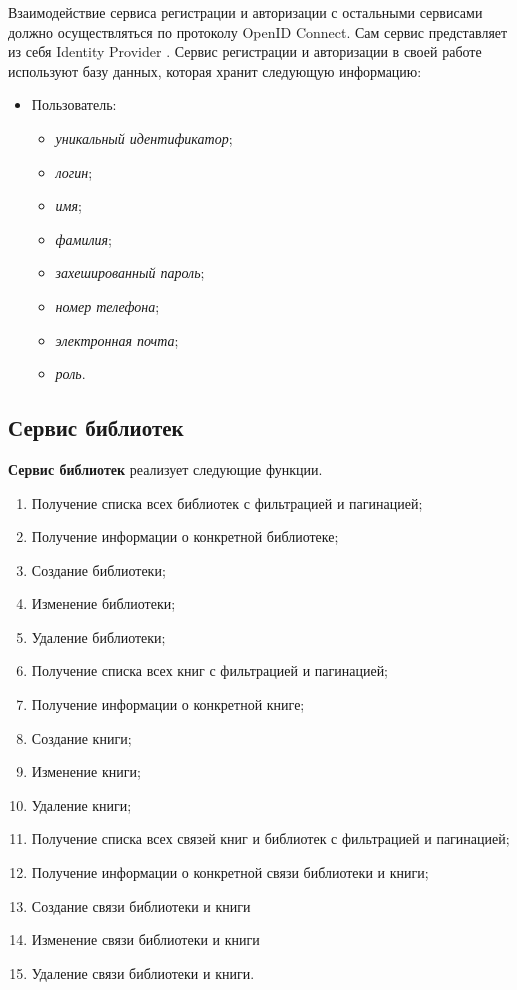 Взаимодействие сервиса регистрации и авторизации с остальными сервисами должно осуществляться по протоколу OpenID Connect. Сам сервис представляет из себя Identity Provider \cite{idprovider}. Сервис регистрации и авторизации в своей работе используют базу данных, которая хранит следующую информацию:
\begin{itemize}
    \item Пользователь:
    \begin{itemize}
        \item \textit{уникальный идентификатор};
        \item \textit{логин};
        \item \textit{имя};
        \item \textit{фамилия};
        \item \textit{захешированный пароль};
        \item \textit{номер телефона};
        \item \textit{электронная почта};
        \item \textit{роль}.
    \end{itemize}
\end{itemize}


\subsection{Сервис библиотек} \label{section:library}

\textbf{Сервис библиотек} реализует следующие функции.
\begin{enumerate}
	\item Получение списка всех библиотек с фильтрацией и пагинацией;
	\item Получение информации о конкретной библиотеке;
	\item Создание библиотеки;
	\item Изменение библиотеки;
	\item Удаление библиотеки;
  \item Получение списка всех книг с фильтрацией и пагинацией;
	\item Получение информации о конкретной книге;
	\item Создание книги;
	\item Изменение книги;
	\item Удаление книги;
  \item Получение списка всех связей книг и библиотек с фильтрацией и пагинацией;
	\item Получение информации о конкретной связи библиотеки и книги;
	\item Создание связи библиотеки и книги
	\item Изменение связи библиотеки и книги
	\item Удаление связи библиотеки и книги.
\end{enumerate}


